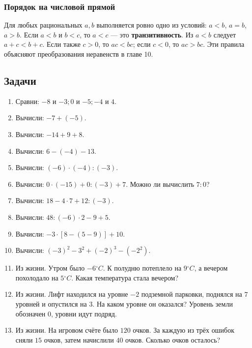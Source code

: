 \documentclass[12pt,a4paper]{article}
\theoremstyle{definition}
\theoremstyle{plain}
\theoremstyle{remark}
\begin{document}
\subsubsection*{Порядок на числовой прямой}
Для любых рациональных \(a,b\) выполняется ровно одно из условий: \(a<b\), \(a=b\), \(a>b\).
Если \(a<b\) и \(b<c\), то \(a<c\) — это \textbf{транзитивность}.
Из \(a<b\) следует \(a+c<b+c\). Если также \(c>0\), то \(ac<bc\); если \(c<0\), то \(ac>bc\).
Эти правила объясняют преобразования неравенств в главе 10.
\subsection*{Задачи}
\begin{enumerate}[label=\thesection.\arabic*.,leftmargin=2.8em,itemsep=12pt]
\item Сравни: \(- 8\) и \(- 3;\allowbreak 0\) и \(- 5;\allowbreak - 4\) и \(4\).
\item Вычисли: \(- 7 + (- 5)\).
\item Вычисли: \(- 14 + 9 + 8\).
\item Вычисли: \(6 - (- 4) - 13\).
\item Вычисли: \((- 6) \cdot  (- 4) : (- 3)\).
\item Вычисли: \(0 \cdot  (- 15) + 0 : (- 3) + 7\). Можно ли вычислить \(7 : 0\)?
\item Вычисли: \(18 - 4 \cdot  7 + 12 : (- 3)\).
\item Вычисли: \(48 : (- 6) \cdot  2 - 9 + 5\).
\item Вычисли: \(- 3 \cdot  [8 - (5 - 9)] + 10\).
\item Вычисли: \((- 3)^{2} - 3^{2} + (- 2)^{3} - (- 2^{2})\).
\item Из жизни. Утром было \(- 6 {}^{\circ} C\). К полудню потеплело на \(9 {}^{\circ} C\), а вечером похолодало на \(5 {}^{\circ} C\). Какая температура стала вечером?
\item Из жизни. Лифт находился на уровне \(- 2\) подземной парковки, поднялся на \(7\) уровней и опустился на \(3\). На каком уровне он оказался? Уровень земли обозначен \(0\), уровни идут подряд.
\item Из жизни. На игровом счёте было \(120\) очков. За каждую из трёх ошибок сняли \(15\) очков, затем начислили \(40\) очков. Сколько очков осталось?

\end{enumerate}
\end{document}
